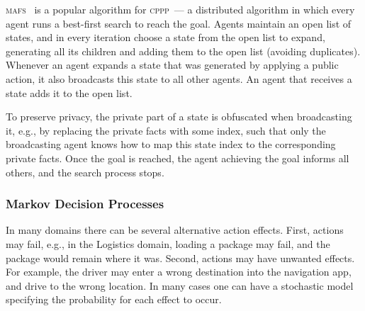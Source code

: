 \documentclass[letterpaper]{article} %
\newcommand{\mafs}{\textsc {mafs}\xspace}
\newcommand{\cppp}{\textsc {cppp}\xspace}
\theoremstyle{remark}
\newcommand{\citep}[1]{\cite{#1}}
\begin{document}
\mafs\ \citep{nissim2014distributed} is a popular algorithm for \cppp\ --- a distributed algorithm in which every agent runs a best-first search to reach the goal. Agents maintain an open list of states, and in every iteration choose a state from the open list to expand, generating all its children and adding them to the open list (avoiding duplicates). Whenever an agent expands a state that was generated by applying a public action, it also broadcasts this state to all other agents. An agent that receives a state adds it to the open list.

To preserve privacy, the private part of a state is obfuscated when broadcasting it, e.g., by replacing the private facts with some index, such that only the broadcasting agent knows how to map this state index to the corresponding private facts. Once the goal is reached, the agent achieving the goal informs all others, and the search process stops.


\subsubsection{Markov Decision Processes}

In many domains there can be several alternative action effects. First, actions may fail, e.g., in the Logistics domain, loading a package may fail, and the package would remain where it was. Second, actions may have unwanted effects. For example, the driver may enter a wrong destination into the navigation app, and drive to the wrong location. In many cases one can have a stochastic model specifying the probability for each effect to occur.
\end{document}
